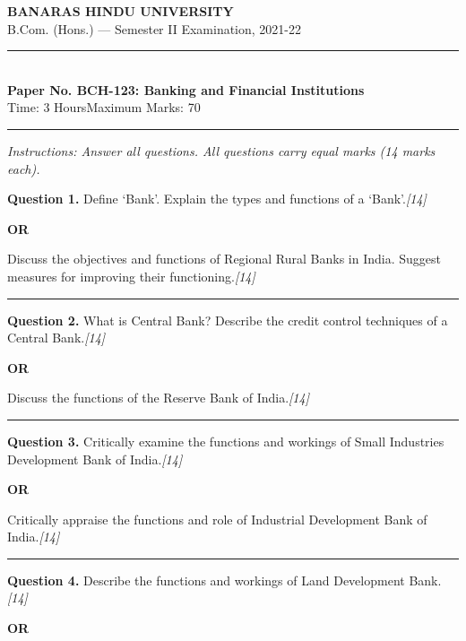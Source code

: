 \documentclass[11pt,a4paper]{article}
\newcommand{\pts}[1]{\hfill   \textit{[#1]}}
\begin{document}
\begin{center}
  {\large\bfseries BANARAS HINDU UNIVERSITY}\\[2pt]
  {\normalsize B.Com. (Hons.) --- Semester II Examination, 2021-22}\\[6pt]
  \rule{0.8\linewidth}{0.5pt}\\[6pt]
  {\large\bfseries Paper No. BCH-123: Banking and Financial Institutions}\\[4pt]
  {\normalsize Time: 3 Hours\hfill Maximum Marks: 70}
\end{center}

\rule{\linewidth}{0.4pt}

\smallskip



\noindent   \textit{Instructions: Answer all questions. All questions carry equal marks (14 marks each).}

\bigskip




\noindent   \textbf{Question 1.}
Define `Bank'. Explain the types and functions of a `Bank'.\pts{14}

\centerline{   \textbf{OR}}

Discuss the objectives and functions of Regional Rural Banks in India. Suggest measures for improving their functioning.\pts{14}

\medskip\rule{\linewidth}{0.2pt}




\noindent   \textbf{Question 2.}
What is Central Bank? Describe the credit control techniques of a Central Bank.\pts{14}

\centerline{   \textbf{OR}}

Discuss the functions of the Reserve Bank of India.\pts{14}

\medskip\rule{\linewidth}{0.2pt}




\noindent   \textbf{Question 3.}
Critically examine the functions and workings of Small Industries Development Bank of India.\pts{14}

\centerline{   \textbf{OR}}

Critically appraise the functions and role of Industrial Development Bank of India.\pts{14}

\medskip\rule{\linewidth}{0.2pt}




\noindent   \textbf{Question 4.}
Describe the functions and workings of Land Development Bank.\pts{14}

\centerline{   \textbf{OR}}
\end{document}
